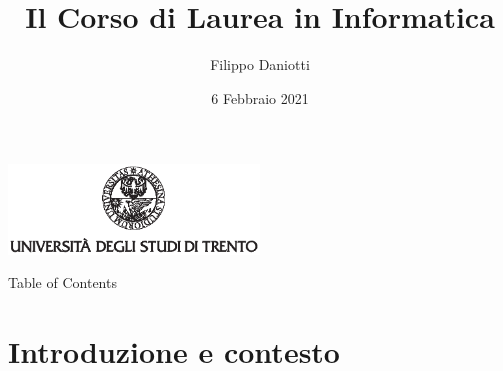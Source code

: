 \documentclass[aspectratio=1610]{beamer}
\title{Il Corso di Laurea in Informatica}
\author{Filippo Daniotti}
\date{6 Febbraio 2021}
\institute[DISI]{Dipartimento di Ingegneria e Scienza dell'Informazione}
\begin{document}
	\begin{frame}[plain]
		\centering
		\includegraphics[width=0.5\textwidth, keepaspectratio]{logo-unitn.eps}		
		\titlepage
	\end{frame}

	\begin{frame}{Table of Contents}
    \tableofcontents
  \end{frame}

	\section{Introduzione e contesto}
\end{document}
